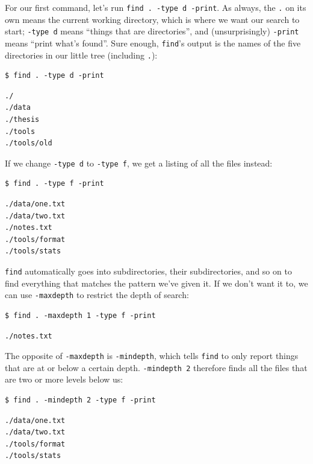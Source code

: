 \documentclass{book}
\begin{document}
For our first command, let's run \texttt{find . -type d -print}. As
always, the \texttt{.} on its own means the current working directory,
which is where we want our search to start; \texttt{-type d} means
``things that are directories'', and (unsurprisingly) \texttt{-print}
means ``print what's found''. Sure enough, \texttt{find}'s output is the
names of the five directories in our little tree (including \texttt{.}):

\begin{verbatim}
$ find . -type d -print
\end{verbatim}

\begin{verbatim}
./
./data
./thesis
./tools
./tools/old
\end{verbatim}

If we change \texttt{-type d} to \texttt{-type f}, we get a listing of
all the files instead:

\begin{verbatim}
$ find . -type f -print
\end{verbatim}

\begin{verbatim}
./data/one.txt
./data/two.txt
./notes.txt
./tools/format
./tools/stats
\end{verbatim}

\texttt{find} automatically goes into subdirectories, their
subdirectories, and so on to find everything that matches the pattern
we've given it. If we don't want it to, we can use \texttt{-maxdepth} to
restrict the depth of search:

\begin{verbatim}
$ find . -maxdepth 1 -type f -print
\end{verbatim}

\begin{verbatim}
./notes.txt
\end{verbatim}

The opposite of \texttt{-maxdepth} is \texttt{-mindepth}, which tells
\texttt{find} to only report things that are at or below a certain
depth. \texttt{-mindepth 2} therefore finds all the files that are two
or more levels below us:

\begin{verbatim}
$ find . -mindepth 2 -type f -print
\end{verbatim}

\begin{verbatim}
./data/one.txt
./data/two.txt
./tools/format
./tools/stats
\end{verbatim}
\end{document}
